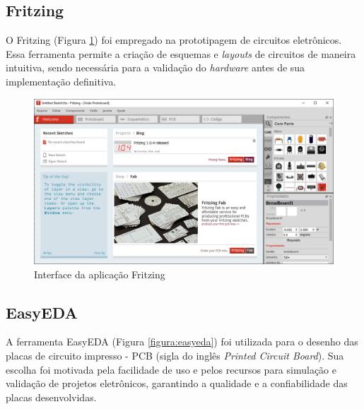 \subsection{Fritzing}
O Fritzing (Figura \ref{figura:fritzing}) foi empregado na prototipagem de circuitos eletrônicos. Essa ferramenta permite a criação de esquemas e \textit{layouts} de circuitos de maneira intuitiva, sendo necessária para a validação do \textit{hardware} antes de sua implementação definitiva.

\begin{figure}[!htb] \centering
  \caption{Interface da aplicação Fritzing} \label{figura:fritzing}
  \begin{varwidth}{\linewidth}
    \includegraphics[width=16cm]{figuras/fritzing.png}
  \end{varwidth}
\end{figure}

\subsection{EasyEDA}
A ferramenta EasyEDA (Figura \ref{figura:easyeda}) foi utilizada para o desenho das placas de circuito impresso - PCB (sigla do inglês \textit{Printed Circuit Board}). Sua escolha foi motivada pela facilidade de uso e pelos recursos para simulação e validação de projetos eletrônicos, garantindo a qualidade e a confiabilidade das placas desenvolvidas.

